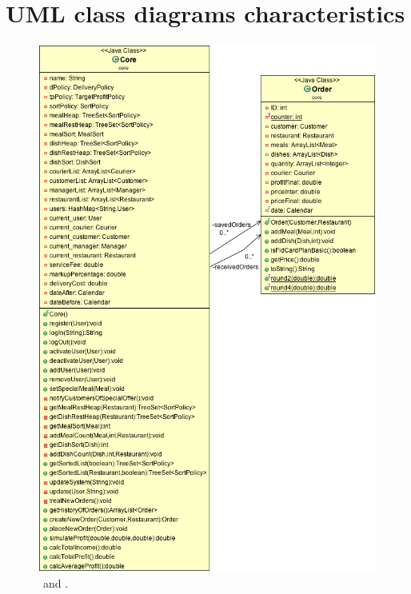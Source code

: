 \section{UML class diagrams characteristics} %
\label{sec:uml_class_diagrams_characteristics}
\begin{figure}[H]
  \begin{center}
    \includegraphics[scale=0.57]{./img/CoreDiagram.png}
    \end{center}
  \caption{\umld \Core~and \Order.}
  \label{fig:core_order_uml}
\end{figure}
